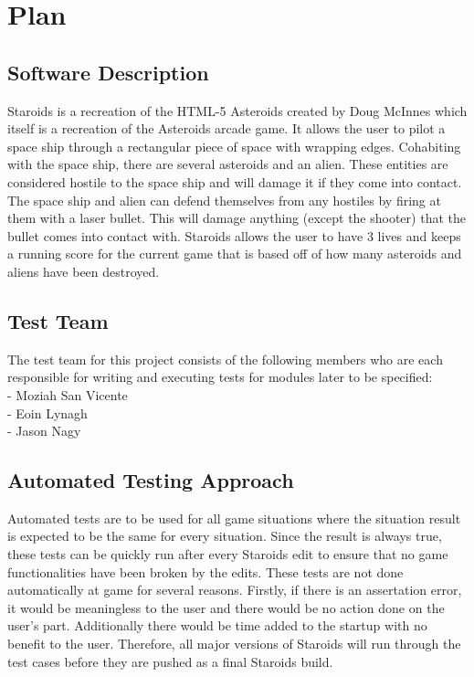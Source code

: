 \documentclass[12pt, titlepage]{article}
\begin{document}
\section{Plan}

\subsection{Software Description}
Staroids is a recreation of the HTML-5 Asteroids created by Doug McInnes which itself is a recreation of the Asteroids arcade game. It allows the user to pilot a space ship through a rectangular piece of space with wrapping edges. Cohabiting with the space ship, there are several asteroids and an alien. These entities are considered hostile to the space ship and will damage it if they come into contact. The space ship and alien can defend themselves from any hostiles by firing at them with a laser bullet. This will damage anything (except the shooter) that the bullet comes into contact with. Staroids allows the user to have 3 lives and keeps a running score for the current game that is based off of how many asteroids and aliens have been destroyed.

\subsection{Test Team}
The test team for this project consists of the following members who are each responsible for writing and executing tests for modules later to be specified:\\
- Moziah San Vicente\\
- Eoin Lynagh\\
- Jason Nagy\\ %
\subsection{Automated Testing Approach}
Automated tests are to be used for all game situations where the situation result is expected to be the same for every situation. Since the result is always true, these tests can be quickly run after every Staroids edit to ensure that no game functionalities have been broken by the edits. These tests are not done automatically at game for several reasons. Firstly, if there is an assertation error, it would be meaningless to the user and there would be no action done on the user's part. Additionally there would be time added to the startup with no benefit to the user. Therefore, all major versions of Staroids will run through the test cases before they are pushed as a final Staroids build.
\end{document}
